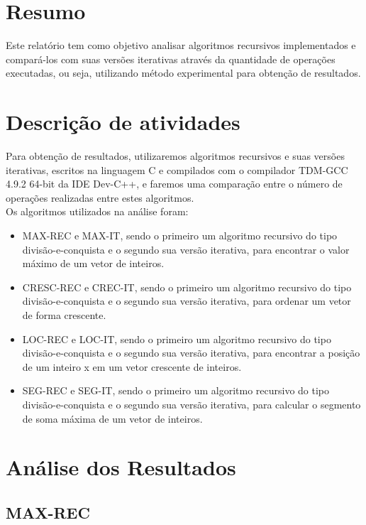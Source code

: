 \documentclass[a4paper, 12pt]{article}
\begin{document}
\newpage
{}
\section{Resumo}

Este relatório tem como objetivo analisar algoritmos recursivos implementados e compará-los com suas versões iterativas através da quantidade de operações executadas, ou seja, utilizando método experimental para obtenção de resultados.\\

\newpage

\section{Descrição de atividades}

Para obtenção de resultados, utilizaremos algoritmos recursivos e suas versões iterativas, escritos na linguagem C e compilados com o compilador TDM-GCC 4.9.2 64-bit da IDE Dev-C++, e faremos uma comparação entre o número de operações realizadas entre estes algoritmos. \\
Os algoritmos utilizados na análise foram:
\begin{itemize}
	\item MAX-REC  e MAX-IT, sendo o primeiro um algoritmo recursivo do tipo divisão-e-conquista e o segundo sua versão iterativa, para encontrar o valor máximo de um vetor de inteiros.
	\item CRESC-REC e CREC-IT, sendo o primeiro um algoritmo recursivo do tipo divisão-e-conquista e o segundo sua versão iterativa, para ordenar um vetor de forma crescente.
	\item LOC-REC e LOC-IT, sendo o primeiro um algoritmo recursivo do tipo divisão-e-conquista e o segundo sua versão iterativa, para encontrar a posição de um inteiro x em um vetor crescente de inteiros.
	\item SEG-REC e SEG-IT, sendo o primeiro um algoritmo recursivo do tipo divisão-e-conquista e o segundo sua versão iterativa, para calcular o segmento de soma máxima de um vetor de inteiros.
\end{itemize}

\newpage
\section{Análise dos Resultados}

\subsection{MAX-REC}
\end{document}
